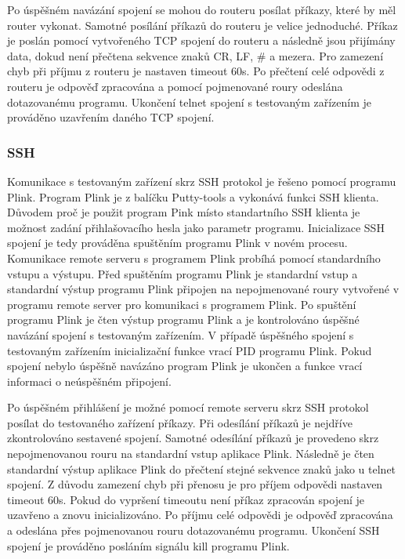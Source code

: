 Po úspěšném navázání spojení se mohou do routeru posílat příkazy, které by měl router vykonat. Samotné posílání příkazů do routeru je velice jednoduché. Příkaz je poslán pomocí vytvořeného TCP spojení do routeru a následně jsou přijímány data, dokud není přečtena sekvence znaků CR, LF, \# a mezera. Pro zamezení chyb při příjmu z routeru je nastaven timeout 60s. Po přečtení celé odpovědi z routeru je odpověď zpracována a pomocí pojmenované roury odeslána dotazovanému programu. Ukončení telnet spojení s testovaným zařízením je prováděno uzavřením daného TCP spojení.

\subsubsection{SSH}
Komunikace s testovaným zařízení skrz SSH protokol je řešeno pomocí programu Plink. Program Plink je z balíčku Putty-tools a vykonává funkci SSH klienta. Důvodem proč je použit program Pink místo standartního SSH klienta je možnost zadání přihlašovacího hesla jako parametr programu. Inicializace SSH spojení je tedy prováděna spuštěním programu Plink v novém procesu. Komunikace remote serveru s programem Plink probíhá pomocí standardního vstupu a výstupu. Před spuštěním programu Plink je standardní vstup a standardní výstup programu Plink připojen na nepojmenované roury vytvořené v programu remote server pro komunikaci s programem Plink. Po spuštění programu Plink je čten výstup programu Plink a je kontrolováno úspěšné navázání spojení s testovaným zařízením. V případě úspěšného spojení s testovaným zařízením inicializační funkce vrací PID programu Plink. Pokud spojení nebylo úspěšně navázáno program Plink je ukončen a funkce vrací informaci o neúspěšném připojení.

Po úspěšném přihlášení je možné pomocí remote serveru skrz SSH protokol posílat do testovaného zařízení příkazy. Při odesílání příkazů je nejdříve zkontrolováno sestavené spojení. Samotné odesílání příkazů je provedeno skrz nepojmenovanou rouru na standardní vstup aplikace Plink. Následně je čten standardní výstup aplikace Plink do přečtení stejné sekvence znaků jako u telnet spojení. Z důvodu zamezení chyb při přenosu je pro příjem odpovědi nastaven timeout 60s. Pokud do vypršení timeoutu není příkaz zpracován spojení je uzavřeno a znovu inicializováno. Po příjmu celé odpovědi je odpověď zpracována a odeslána přes pojmenovanou rouru dotazovanému programu. Ukončení SSH spojení je prováděno posláním signálu kill programu Plink.

